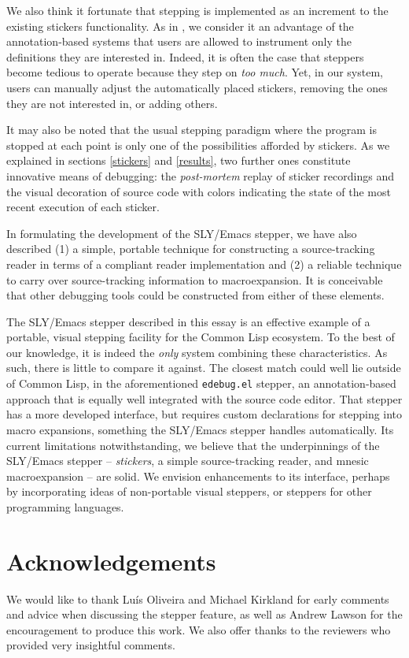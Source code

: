 \documentclass[format=sigconf]{acmart}
\begin{document}
We also think it fortunate that stepping is implemented as an
increment to the existing stickers functionality.  As in
\cite{annotation-based}, we consider it an advantage of the
annotation-based systems that users are allowed to instrument only the
definitions they are interested in.  Indeed, it is often the case that
steppers become tedious to operate because they step on \emph{too
  much}.  Yet, in our system, users can manually adjust the
automatically placed stickers, removing the ones they are not
interested in, or adding others.

It may also be noted that the usual stepping paradigm where the
program is stopped at each point is only one of the possibilities
afforded by stickers.  As we explained in sections \ref{stickers} and
\ref{results}, two further ones constitute innovative means of
debugging: the \emph{post-mortem} replay of sticker recordings and the
visual decoration of source code with colors indicating the state of
the most recent execution of each sticker.

In formulating the development of the SLY/Emacs stepper, we have also
described (1) a simple, portable technique for constructing a
source-tracking reader in terms of a compliant reader implementation
and (2) a reliable technique to carry over source-tracking information
to macroexpansion.  It is conceivable that other debugging tools could
be constructed from either of these elements.

The SLY/Emacs stepper described in this essay is an effective example
of a portable, visual stepping facility for the Common Lisp ecosystem.
To the best of our knowledge, it is indeed the \emph{only} system
combining these characteristics.  As such, there is little to compare
it against.  The closest match could well lie outside of Common Lisp,
in the aforementioned \texttt{edebug.el}\cite{edebug} stepper, an
annotation-based approach that is equally well integrated with the
source code editor.  That stepper has a more developed interface, but
requires custom declarations for stepping into macro expansions,
something the SLY/Emacs stepper handles automatically.  Its current
limitations notwithstanding, we believe that the underpinnings of the
SLY/Emacs stepper -- \emph{stickers}, a simple source-tracking reader,
and mnesic macroexpansion -- are solid.  We envision enhancements to
its interface, perhaps by incorporating ideas of non-portable visual
steppers, or steppers for other programming languages.


\section{Acknowledgements}

We would like to thank Luís Oliveira and Michael Kirkland for early
comments and advice when discussing the stepper feature, as well as
Andrew Lawson for the encouragement to produce this work.  We also
offer thanks to the reviewers who provided very insightful comments.




\end{document}
